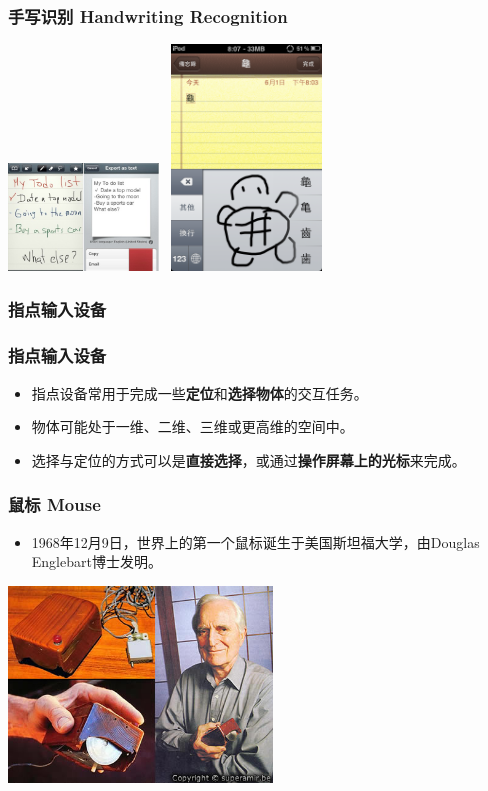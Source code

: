 \documentclass{beamer}
\begin{document}
\begin{frame}
	\frametitle{手写识别 Handwriting Recognition}
	\begin{center}
	\includegraphics[width=4cm]{images/myscriptmemo7212.jpg}~\pause
	\includegraphics[width=4cm]{images/apple-handwriting.png}
	\end{center}
\end{frame}

\subsubsection{指点输入设备}
\begin{frame}
	\frametitle{指点输入设备}
	\beamertemplatetransparentcovereddynamicmedium
	\begin{itemize}[<+->]
		\item 指点设备常用于完成一些\textbf{定位}和\textbf{选择物体}的交互任务。
		\item 物体可能处于一维、二维、三维或更高维的空间中。
		\item 选择与定位的方式可以是\textbf{直接选择}，或通过\textbf{操作屏幕上的光标}来完成。
	\end{itemize}
\end{frame}

\begin{frame}
	\frametitle{鼠标 Mouse}
	\begin{itemize}
	\item 1968年12月9日，世界上的第一个鼠标诞生于美国斯坦福大学，由Douglas Englebart博士发明。
	\end{itemize}
	\begin{center}
	\includegraphics[width=7cm]{images/first-mouse.jpg}
	\end{center}
\end{frame}
\end{document}
